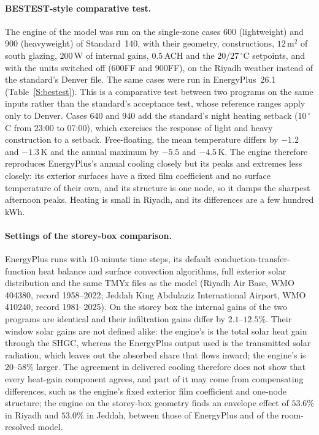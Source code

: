 \documentclass[10pt,a4paper,twocolumn]{article}
\theoremstyle{definition}
\begin{document}
\paragraph{BESTEST-style comparative test.} The engine of the model was run on the single-zone cases 600 (lightweight) and 900 (heavyweight) of Standard~140, with their geometry, constructions, $12\,\text{m}^2$ of south glazing, $200\,$W of internal gains, $0.5\,$ACH and the $20$/$27\,^{\circ}$C setpoints, and with the units switched off (600FF and 900FF), on the Riyadh weather instead of the standard's Denver file. The same cases were run in EnergyPlus~26.1 (Table~\ref{S:bestest}). This is a comparative test between two programs on the same inputs rather than the standard's acceptance test, whose reference ranges apply only to Denver. Cases 640 and 940 add the standard's night heating setback ($10\,^{\circ}$C from 23:00 to 07:00), which exercises the response of light and heavy construction to a setback. Free-floating, the mean temperature differs by $-1.2$ and $-1.3\,$K and the annual maximum by $-5.5$ and $-4.5\,$K. The engine therefore reproduces EnergyPlus's annual cooling closely but its peaks and extremes less closely: its exterior surfaces have a fixed film coefficient and no surface temperature of their own, and its structure is one node, so it damps the sharpest afternoon peaks. Heating is small in Riyadh, and its differences are a few hundred kWh.

\paragraph{Settings of the storey-box comparison.} EnergyPlus runs with $10$-minute time steps, its default conduction-transfer-function heat balance and surface convection algorithms, full exterior solar distribution and the same TMYx files as the model (Riyadh Air Base, WMO 404380, record 1958--2022; Jeddah King Abdulaziz International Airport, WMO 410240, record 1981--2025). On the storey box the internal gains of the two programs are identical and their infiltration gains differ by $2.1$--$12.5$\%. Their window solar gains are not defined alike: the engine's is the total solar heat gain through the SHGC, whereas the EnergyPlus output used is the transmitted solar radiation, which leaves out the absorbed share that flows inward; the engine's is $20$--$58$\% larger. The agreement in delivered cooling therefore does not show that every heat-gain component agrees, and part of it may come from compensating differences, such as the engine's fixed exterior film coefficient and one-node structure; the engine on the storey-box geometry finds an envelope effect of $53.6\%$ in Riyadh and $53.0\%$ in Jeddah, between those of EnergyPlus and of the room-resolved model.
\end{document}
